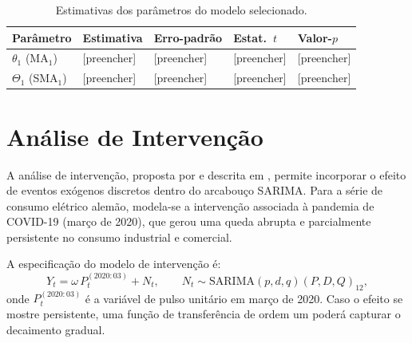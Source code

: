 \documentclass[12pt, a4paper]{article}
\begin{document}
\begin{table}[H]
  \centering
  \caption{Estimativas dos parâmetros do modelo selecionado.}
  \label{tab:parametros}
  \begin{tabularx}{\textwidth}{lXXXX}
    \toprule
    \textbf{Parâmetro} & \textbf{Estimativa} & \textbf{Erro-padrão}
      & \textbf{Estat.\ $t$} & \textbf{Valor-$p$} \\
    \midrule
    $\theta_1$ (MA$_1$)  & [preencher] & [preencher]
      & [preencher] & [preencher] \\
    $\Theta_1$ (SMA$_1$) & [preencher] & [preencher]
      & [preencher] & [preencher] \\
    \bottomrule
  \end{tabularx}
\end{table}

\section{Análise de Intervenção}
\label{sec:intervencao}

A análise de intervenção, proposta por \textcite{BoxTimeSeries} e descrita em
\textcite{SeriesTemporaisMoretti}, permite incorporar o efeito de eventos exógenos
discretos dentro do arcabouço SARIMA. Para a série de consumo elétrico alemão,
modela-se a intervenção associada à pandemia de COVID-19 (março de 2020), que gerou
uma queda abrupta e parcialmente persistente no consumo industrial e comercial.

A especificação do modelo de intervenção é:
\begin{equation}
  Y_t = \omega\, P_t^{(2020:03)} + N_t, \qquad N_t \sim \mathrm{SARIMA}(p,d,q)(P,D,Q)_{12},
\end{equation}
onde $P_t^{(2020:03)}$ é a variável de pulso unitário em março de 2020. Caso o efeito
se mostre persistente, uma função de transferência de ordem um poderá capturar o
decaimento gradual.
\end{document}

